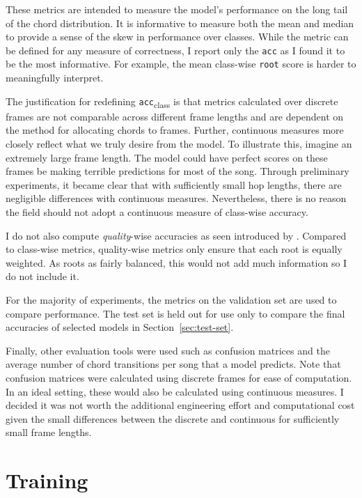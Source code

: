 These metrics are intended to measure the model's performance on the long tail of the chord distribution. It is informative to measure both the mean and median to provide a sense of the skew in performance over classes. While the metric can be defined for any measure of correctness, I report only the \texttt{acc} as I found it to be the most informative. For example, the mean class-wise \texttt{root} score is harder to meaningfully interpret.

The justification for redefining \texttt{acc}\textsubscript{class} is that metrics calculated over discrete frames are not comparable across different frame lengths and are dependent on the method for allocating chords to frames. Further, continuous measures more closely reflect what we truly desire from the model. To illustrate this, imagine an extremely large frame length. The model could have perfect scores on these frames be making terrible predictions for most of the song. Through preliminary experiments, it became clear that with sufficiently small hop lengths, there are negligible differences with continuous measures. Nevertheless, there is no reason the field should not adopt a continuous measure of class-wise accuracy.

I do not also compute \emph{quality}-wise accuracies as seen introduced by \citet{CurriculumLearning}. Compared to class-wise metrics, quality-wise metrics only ensure that each root is equally weighted. As roots as fairly balanced, this would not add much information so I do not include it.

For the majority of experiments, the metrics on the validation set are used to compare performance. The test set is held out for use only to compare the final accuracies of selected models in Section~\ref{sec:test-set}.

Finally, other evaluation tools were used such as confusion matrices and the average number of chord transitions per song that a model predicts. Note that confusion matrices were calculated using discrete frames for ease of computation. In an ideal setting, these would also be calculated using continuous measures. I decided it was not worth the additional engineering effort and computational cost given the small differences between the discrete and continuous for sufficiently small frame lengths.

\section{Training}\label{sec:training}


